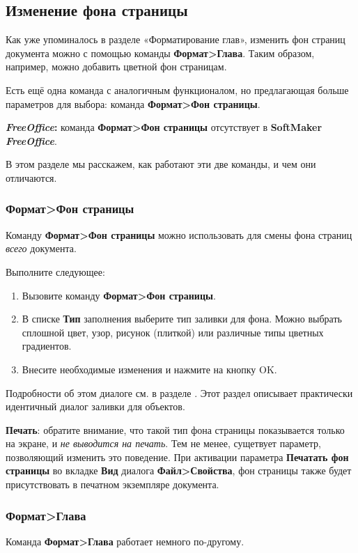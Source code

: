 ﻿\documentclass[a4paper,10pt]{article}
\begin{document}
\subsection{Изменение фона страницы} \label{sec:изменфонастр}
Как уже упоминалось в разделе «Форматирование глав», изменить фон страниц документа можно с помощью команды \textbf{Формат>Глава}. Таким образом, например, можно добавить цветной фон страницам.

Есть ещё одна команда с аналогичным функционалом, но предлагающая больше параметров для выбора: команда \textbf{Формат>Фон страницы}.
\begin{mdframed}[backgroundcolor=pink!50]
\textbf{\textit{FreeOffice}:} команда \textbf{Формат>Фон страницы} отсутствует в \textbf{SoftMaker} \textbf{\textit{FreeOffice}}.
\end{mdframed}

В этом разделе мы расскажем, как работают эти две команды, и чем они отличаются.

\subsubsection{\textbf{Формат>Фон страницы}}
Команду \textbf{Формат>Фон страницы} можно использовать для смены фона страниц \textit{всего} документа.

Выполните следующее:
\begin{enumerate}
 \item Вызовите команду \textbf{Формат>Фон страницы}.
 \item В списке \textbf{Тип} заполнения выберите тип заливки для фона. Можно выбрать сплошной цвет, узор, рисунок (плиткой) или различные типы цветных градиентов.
 \item Внесите необходимые изменения и нажмите на кнопку OK.
\end{enumerate}

Подробности об этом диалоге см. в разделе . Этот раздел описывает практически идентичный диалог заливки для объектов.

\textbf{Печать}: обратите внимание, что такой тип фона страницы показывается только на экране, и \textit{не выводится на печать}. Тем не менее, сущетвует параметр, позволяющий изменить это поведение. При активации параметра \textbf{Печатать фон страницы} во вкладке \textbf{Вид} диалога \textbf{Файл>Свойства}, фон страницы также будет присутствовать в печатном экземпляре документа.

\subsubsection{\textbf{Формат>Глава}}
Команда \textbf{Формат>Глава} работает немного по-другому.
\end{document}
